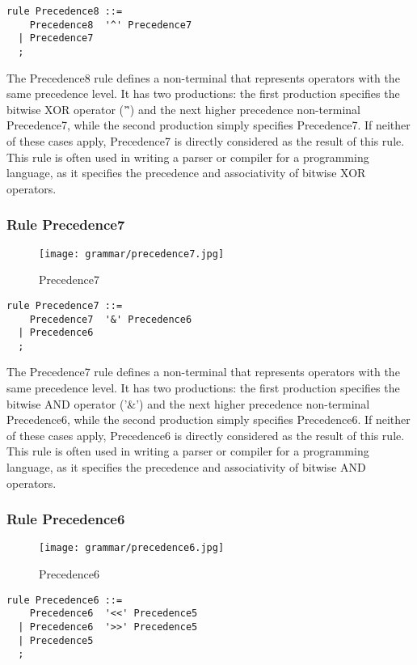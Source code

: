 \begin{lstlisting}
rule Precedence8 ::=
    Precedence8  '^' Precedence7 
  | Precedence7 
  ;
\end{lstlisting}

The Precedence8 rule defines a non-terminal that represents operators with the same precedence level. It has two productions: the first production specifies the bitwise XOR operator ('\^') and the next higher precedence non-terminal Precedence7, while the second production simply specifies Precedence7. If neither of these cases apply, Precedence7 is directly considered as the result of this rule. This rule is often used in writing a parser or compiler for a programming language, as it specifies the precedence and associativity of bitwise XOR operators.

\subsubsection*{Rule Precedence7}

\begin{figure}[!ht]
\centering
\texttt{[image: grammar/precedence7.jpg]}
\caption{Precedence7}
\end{figure}

\begin{lstlisting}
rule Precedence7 ::=
    Precedence7  '&' Precedence6 
  | Precedence6 
  ;
\end{lstlisting}

The Precedence7 rule defines a non-terminal that represents operators with the same precedence level. It has two productions: the first production specifies the bitwise AND operator ('\&') and the next higher precedence non-terminal Precedence6, while the second production simply specifies Precedence6. If neither of these cases apply, Precedence6 is directly considered as the result of this rule. This rule is often used in writing a parser or compiler for a programming language, as it specifies the precedence and associativity of bitwise AND operators.

\subsubsection*{Rule Precedence6}

\begin{figure}[!ht]
\centering
\texttt{[image: grammar/precedence6.jpg]}
\caption{Precedence6}
\end{figure}

\begin{lstlisting}
rule Precedence6 ::=
    Precedence6  '<<' Precedence5 
  | Precedence6  '>>' Precedence5 
  | Precedence5 
  ;
\end{lstlisting}


